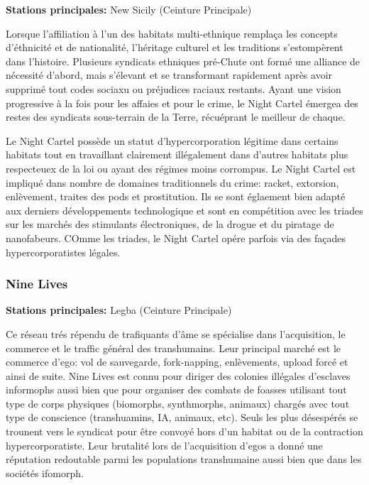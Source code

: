 \textbf{Stations principales:} New Sicily (Ceinture Principale) 

Lorsque l'affiliation à l'un des habitats multi-ethnique remplaça les concepts d'éthnicité et de nationalité, l'héritage culturel et les traditions s'estompèrent dans l'histoire. Plusieurs syndicats ethniques pré-Chute ont formé une alliance de nécessité d'abord, mais s'élevant et se transformant rapidement après avoir supprimé tout codes sociaxu ou préjudices raciaux restants. Ayant une vision progressive à la fois pour les affaies et pour le crime, le Night Cartel émergea des restes des syndicats sous-terrain de la Terre, récuéprant le meilleur de chaque. 

Le Night Cartel possède un statut d'hypercorporation légitime dans certains habitats tout en travaillant clairement illégalement dans d'autres habitats plus respecteuex de la loi ou ayant des régimes moins corrompus. Le Night Cartel est impliqué dans nombre de domaines traditionnels du crime: racket, extorsion, enlèvement, traites des pods et prostitution. Ils se sont églaement bien adapté aux derniers développements technologique et sont en compétition avec les triades sur les marchés des stimulants électroniques, de la drogue et du piratage de nanofabeurs. COmme les triades, le Night Cartel opére parfois via des façades hypercorporatistes légales. 

\subsubsection{Nine Lives} \label{sec:nine-lives} 

\textbf{Stations principales:} Legba (Ceinture Principale) 

Ce réseau trés répendu de trafiquants d'âme se spécialise dans l'acquisition, le commerce et le traffic général des transhumains. Leur principal marché est le commerce d'ego: vol de sauvegarde, fork-napping, enlèvements, upload forcé et ainsi de suite. Nine Lives est connu pour diriger des colonies illégales d'esclaves informophs aussi bien que pour organiser des combats de foasses utilisant tout type de corps physiques (biomorphs, synthmorphs, animaux) chargés avec tout type de conscience (transhuamins, IA, animaux, etc). Seuls les plus désespérés se trounent vers le syndicat pour être convoyé hors d'un habitat ou de la contraction hypercorporatiste. Leur brutalité lors de l'acquisition d'egos a donné une réputation redoutable parmi les populations transhumaine aussi bien que dans les sociétés ifomorph. 

